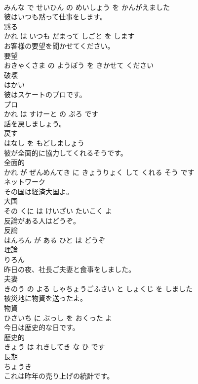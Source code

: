 \documentclass[8pt]{extreport}
\begin{document}
\begin{CJK}{UTF8}{min}
\\	みんな で せいひん の めいしょう を かんがえました			
\\	彼はいつも黙って仕事をします。	
\\	黙る 
\\	かれ は いつも だまって しごと を します			
\\	お客様の要望を聞かせてください。	
\\	要望 
\\	おきゃくさま の ようぼう を きかせて ください			
\\	破壊	
\\	はかい			
\\	彼はスケートのプロです。	
\\	プロ 
\\	かれ は すけーと の ぷろ です			
\\	話を戻しましょう。	
\\	戻す 
\\	はなし を もどしましょう			
\\	彼が全面的に協力してくれるそうです。	
\\	全面的 
\\	かれ が ぜんめんてき に きょうりょく して くれる そう です			
\\	ネットワーク	
\\	その国は経済大国よ。	
\\	大国 
\\	その くに は けいざい たいこく よ			
\\	反論がある人はどうぞ。	
\\	反論 
\\	はんろん が ある ひと は どうぞ			
\\	理論	
\\	りろん			
\\	昨日の夜、社長ご夫妻と食事をしました。	
\\	夫妻 
\\	きのう の よる しゃちょうごふさい と しょくじ を しました			
\\	被災地に物資を送ったよ。	
\\	物資 
\\	ひさいち に ぶっし を おくった よ			
\\	今日は歴史的な日です。	
\\	歴史的 
\\	きょう は れきしてき な ひ です			
\\	長期	
\\	ちょうき			
\\	これは昨年の売り上げの統計です。	

\end{CJK}
\end{document}
